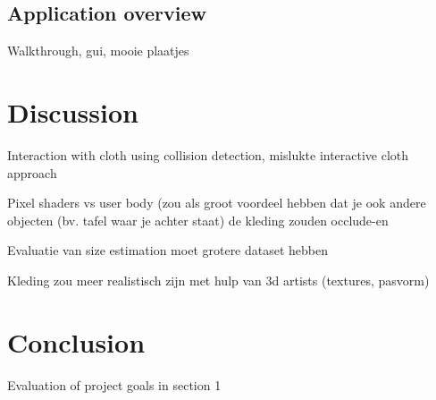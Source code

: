 \documentclass[a4paper]{article}
\begin{document}
\subsection{Application overview}

Walkthrough, gui, mooie plaatjes

\section{Discussion}

Interaction with cloth using collision detection, mislukte interactive cloth approach

Pixel shaders vs user body (zou als groot voordeel hebben dat je ook andere objecten (bv. tafel waar je achter staat) de kleding zouden occlude-en

Evaluatie van size estimation moet grotere dataset hebben

Kleding zou meer realistisch zijn met hulp van 3d artists (textures, pasvorm)

\section{Conclusion}

Evaluation of project goals in section 1
\end{document}
